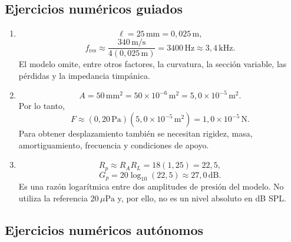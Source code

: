 \subsection*{Ejercicios numéricos guiados}

\begin{enumerate}[label=\textbf{G\arabic*.},leftmargin=*]
    \item
    \[
        \ell=25\,\text{mm}=0{,}025\,\text{m},
    \]
    \[
        f_\mathrm{res}
          \approx\frac{340\,\text{m}/\text{s}}
                        {4(0{,}025\,\text{m})}
          =3400\,\text{Hz}
          \approx3{,}4\,\text{kHz}.
    \]
    El modelo omite, entre otros factores, la curvatura, la sección variable,
    las pérdidas y la impedancia timpánica.

    \item
    \[
        A=50\,\text{mm}^2
          =50\times10^{-6}\,\text{m}^2
          =5{,}0\times10^{-5}\,\text{m}^2.
    \]
    Por lo tanto,
    \[
        F\approx
        (0{,}20\,\text{Pa})(5{,}0\times10^{-5}\,\text{m}^2)
        =1{,}0\times10^{-5}\,\text{N}.
    \]
    Para obtener desplazamiento también se necesitan rigidez, masa,
    amortiguamiento, frecuencia y condiciones de apoyo.

    \item
    \[
        R_p\approx R_A R_L=18(1{,}25)=22{,}5,
    \]
    \[
        G_p=20\log_{10}(22{,}5)\approx27{,}0\,\text{dB}.
    \]
    Es una razón logarítmica entre dos amplitudes de presión del modelo. No
    utiliza la referencia \(20\,\mu\text{Pa}\) y, por ello, no es un nivel
    absoluto en dB SPL.
\end{enumerate}

\subsection*{Ejercicios numéricos autónomos}

